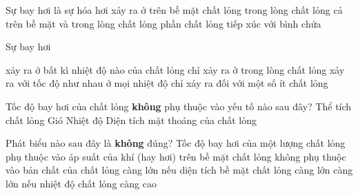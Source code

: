 \begin{ex} 
	Sự bay hơi là sự hóa hơi xảy ra ở
	\choice
	{\True trên bề mặt chất lỏng}
	{trong lòng chất lỏng}
	{cả trên bề mặt và trong lòng chất lỏng}
	{phần chất lỏng tiếp xúc với bình chứa}
\end{ex}





\begin{ex}
	Sự bay hơi
	
	\choice
	{\True xảy ra ở bất kì nhiệt độ nào của chất lỏng}
	{chỉ xảy ra ở trong lòng chất lỏng}
	{xảy ra với tốc độ như nhau ở mọi nhiệt độ}
	{chỉ xảy ra đối với một số ít chất lỏng}
	\end{ex}










\begin{ex}%
	Tốc độ bay hơi của chất lỏng \textbf{không} phụ thuộc vào yếu tố nào sau đây?
	\choice
	{\True Thể tích chất lỏng}
	{Gió}
	{Nhiệt độ}
	{Diện tích mặt thoáng của chất lỏng}
	\end{ex}

\begin{ex}
	Phát biểu nào sau đây là \textbf{không} đúng? Tốc độ bay hơi của một lượng chất lỏng
	\choice
	{phụ thuộc vào áp suất của khí (hay hơi) trên bề mặt chất lỏng}
	{\True không phụ thuộc vào bản chất của chất lỏng}
	{càng lớn nếu diện tích bề mặt chất lỏng càng lớn}
	{càng lớn nếu nhiệt độ chất lỏng càng cao}
	\end{ex}

